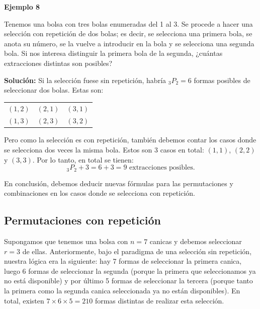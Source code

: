 \documentclass[
  letterpaper,
  DIV=11,
  numbers=noendperiod]{scrreprt}
\begin{document}
\begin{examplebox}

\begin{center}
\textbf{Ejemplo 8}

\end{center}

Tenemos una bolsa con tres bolas enumeradas del 1 al 3. Se procede a
hacer una selección con repetición de dos bolas; es decir, se selecciona
una primera bola, se anota su número, se la vuelve a introducir en la
bola y se selecciona una segunda bola. Si nos interesa distinguir la
primera bola de la segunda, ¿cuántas extracciones distintas son
posibles?

\textbf{Solución:} Si la selección fuese sin repetición, habría
\(_3P_2 = 6\) formas posibles de seleccionar dos bolas. Estas son:

\begin{flexcenter}

\begin{half}

\begin{longtable}[]{@{}lll@{}}
\toprule\noalign{}
\endhead
\bottomrule\noalign{}
\endlastfoot
\((1,2)\) & \((2,1)\) & \((3,1)\) \\
\((1,3)\) & \((2,3)\) & \((3,2)\) \\
\end{longtable}

\end{half}

\end{flexcenter}

Pero como la selección es con repetición, también debemos contar los
casos donde se selecciona dos veces la misma bola. Estos son 3 casos en
total: \((1,1)\), \((2,2)\) y \((3,3)\). Por lo tanto, en total se
tienen: \[_3P_2 + 3 = 6 + 3 = 9 \text{ extracciones posibles.}\]

\end{examplebox}

En conclusión, debemos deducir nuevas fórmulas para las permutaciones y
combinaciones en los casos donde se selecciona con repetición.

\hypertarget{permutaciones-con-repeticiuxf3n}{%
\subsection{Permutaciones con
repetición}\label{permutaciones-con-repeticiuxf3n}}

Supongamos que tenemos una bolsa con \(n=7\) canicas y debemos
seleccionar \(r=3\) de ellas. Anteriormente, bajo el paradigma de una
selección sin repetición, nuestra lógica era la siguiente: hay 7 formas
de seleccionar la primera canica, luego 6 formas de seleccionar la
segunda (porque la primera que seleccionamos ya no está disponible) y
por último 5 formas de seleccionar la tercera (porque tanto la primera
como la segunda canica seleccionada ya no están disponibles). En total,
existen \(7 \times 6 \times 5 = 210\) formas distintas de realizar esta
selección.
\end{document}
